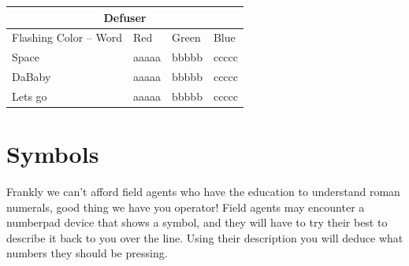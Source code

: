 \documentclass{article}
\begin{document}
\begin{center}
\begin{tabular}{ |p{3cm}||p{3cm}|p{3cm}|p{3cm}|  }
 \hline
 \multicolumn{4}{|c|}{Defuser} \\
 \hline
 Flashing Color -- Word& Red & Green & Blue\\
 \hline
 Space   & aaaaa    &bbbbb&   ccccc\\
 DaBaby&   aaaaa  & bbbbb   &ccccc\\
 Lets go &aaaaa & bbbbb&  ccccc\\
 \hline
\end{tabular}
\end{center}

\newpage
\BgThispage
\section* {Symbols}
Frankly we can't afford field agents who have the education to understand roman numerals, good thing we have you operator! Field agents may encounter a numberpad device that shows a symbol, and they will have to try their best to describe it back to you over the line. Using their description you will deduce what numbers they should be pressing.
\end{document}
